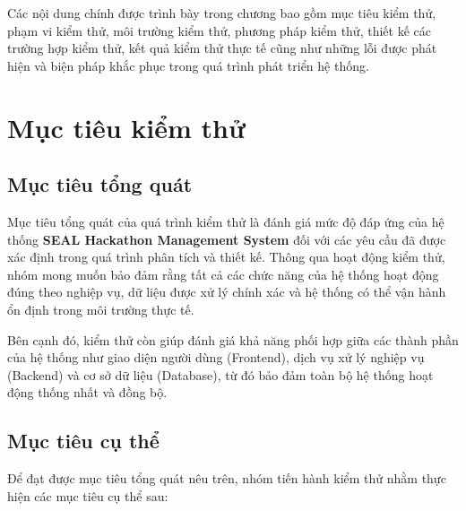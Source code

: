 Các nội dung chính được trình bày trong chương bao gồm mục tiêu kiểm thử, phạm vi kiểm thử, môi trường kiểm thử, phương pháp kiểm thử, thiết kế các trường hợp kiểm thử, kết quả kiểm thử thực tế cũng như những lỗi được phát hiện và biện pháp khắc phục trong quá trình phát triển hệ thống.


\section{Mục tiêu kiểm thử}

\subsection{Mục tiêu tổng quát}

Mục tiêu tổng quát của quá trình kiểm thử là đánh giá mức độ đáp ứng của hệ thống \textbf{SEAL Hackathon Management System} đối với các yêu cầu đã được xác định trong quá trình phân tích và thiết kế. Thông qua hoạt động kiểm thử, nhóm mong muốn bảo đảm rằng tất cả các chức năng của hệ thống hoạt động đúng theo nghiệp vụ, dữ liệu được xử lý chính xác và hệ thống có thể vận hành ổn định trong môi trường thực tế.

Bên cạnh đó, kiểm thử còn giúp đánh giá khả năng phối hợp giữa các thành phần của hệ thống như giao diện người dùng (Frontend), dịch vụ xử lý nghiệp vụ (Backend) và cơ sở dữ liệu (Database), từ đó bảo đảm toàn bộ hệ thống hoạt động thống nhất và đồng bộ.

\subsection{Mục tiêu cụ thể}

Để đạt được mục tiêu tổng quát nêu trên, nhóm tiến hành kiểm thử nhằm thực hiện các mục tiêu cụ thể sau:

